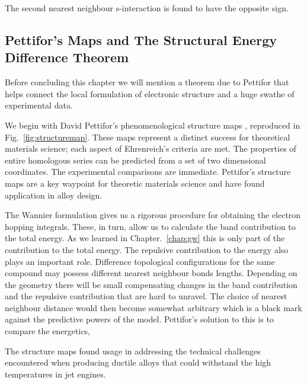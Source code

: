 The second nearest neighbour s-interaction is found to have the opposite sign.


\subsection{Pettifor's Maps and The Structural Energy Difference Theorem}
Before concluding this chapter we will mention a theorem due to Pettifor
that helps connect the local formulation of electronic structure and
a huge swathe of experimental data. 

We begin with David Pettifor's phenomenological structure maps \cite{pettifor84, pettifor86a},
reproduced in Fig.~\ref{fig:structuremap}. These maps represent a distinct success for 
theoretical materials science; each aspect of Ehrenreich's criteria are met.
The properties of entire homologous series can be predicted from a set of two dimensional
coordinates. The experimental comparisons are immediate.
Pettifor's structure maps are a key waypoint for
theoretic materials science and have found application in alloy design. 

The Wannier formulation gives
us a rigorous procedure for obtaining the electron hopping integrals.
These, in turn, allow us to calculate the band contribution to the total energy.
As we learned in Chapter.~\ref{chap:gw} this is only part of the 
contribution to the total energy. The repulsive contribution to the energy
also plays an important role. Difference topological configurations for
the same compound may possess different nearest neighbour bonds lengths.
Depending on the geometry there will be small compensating changes in 
the band contribution and the repulsive contribution that are hard to
unravel. The choice of nearest neighbour distance would then become
somewhat arbitrary which is a black mark against the predictive powers of
the model. Pettifor's solution to this is to compare the energetics,


The structure maps found usage in addressing the technical challenges encountered 
when producing ductile alloys that could withstand the high temperatures in 
jet engines\cite{sutton19}. 

